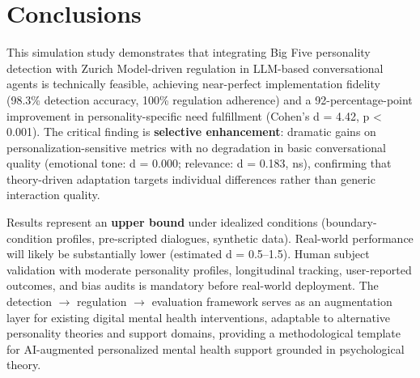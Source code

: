 \section{Conclusions}\label{conclusions}

This simulation study demonstrates that integrating Big Five personality detection with Zurich Model-driven regulation in LLM-based conversational agents is technically feasible, achieving near-perfect implementation fidelity (98.3\% detection accuracy, 100\% regulation adherence) and a 92-percentage-point improvement in personality-specific need fulfillment (Cohen's d = 4.42, p \textless{} 0.001). The critical finding is \textbf{selective enhancement}: dramatic gains on personalization-sensitive metrics with no degradation in basic conversational quality (emotional tone: d = 0.000; relevance: d = 0.183, ns), confirming that theory-driven adaptation targets individual differences rather than generic interaction quality.

Results represent an \textbf{upper bound} under idealized conditions (boundary-condition profiles, pre-scripted dialogues, synthetic data). Real-world performance will likely be substantially lower (estimated d = 0.5--1.5). Human subject validation with moderate personality profiles, longitudinal tracking, user-reported outcomes, and bias audits is mandatory before real-world deployment. The detection $\rightarrow$ regulation $\rightarrow$ evaluation framework serves as an augmentation layer for existing digital mental health interventions, adaptable to alternative personality theories and support domains, providing a methodological template for AI-augmented personalized mental health support grounded in psychological theory.

